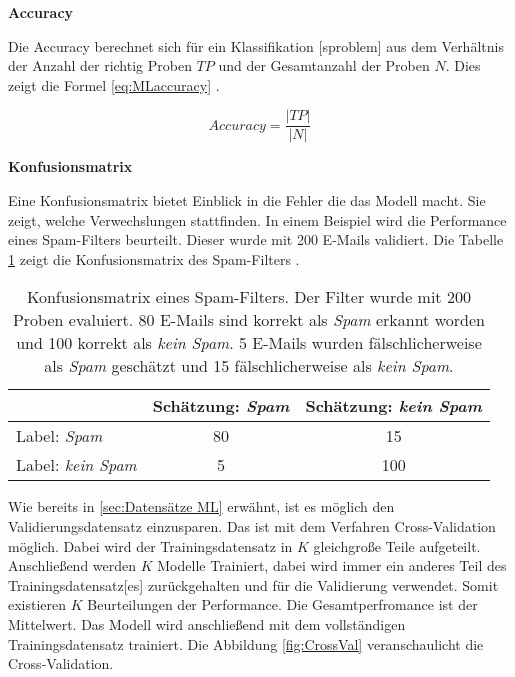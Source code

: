\textbf{\gls{Accuracy}}\par

Die \gls{Accuracy} berechnet sich für ein \gls{Klassifikation} [sproblem] aus dem Verhältnis der Anzahl der richtig  Proben \(TP\) und der Gesamtanzahl der Proben \(N\). Dies zeigt die Formel \ref{eq:MLaccuracy} \cite{Zheng.2015}.

\begin{equation}
Accuracy = \frac{|TP|}{|N|}
\label{eq:MLaccuracy}
\end{equation}

\textbf{\gls{Konfusionsmatrix}}\par
Eine \gls{Konfusionsmatrix} bietet Einblick in die Fehler die das Modell macht. Sie zeigt, welche Verwechslungen stattfinden. In einem Beispiel wird die Performance eines Spam-Filters beurteilt. Dieser wurde mit 200 E-Mails validiert. Die Tabelle \ref{tab:bspConfMat} zeigt die \gls{Konfusionsmatrix} des Spam-Filters \cite{Zheng.2015}.

\begin{table}[h]
    \centering
    \begin{tabular}{|l|c|c|}
        \hline
                                    & Schätzung: \textit{Spam} & Schätzung: \textit{kein Spam}\\
        \hline
        Label: \textit{Spam}        & 80 & 15 \\
        \hline
        Label: \textit{kein Spam}   &  5 & 100\\
        \hline
    \end{tabular}
    \caption{\gls{Konfusionsmatrix} eines Spam-Filters. Der Filter wurde mit 200 Proben evaluiert. 80 E-Mails sind korrekt als \textit{Spam} erkannt worden und 100 korrekt als \textit{kein Spam}. 5 E-Mails wurden fälschlicherweise als \textit{Spam} geschätzt und 15 fälschlicherweise als \textit{kein Spam}.}
    \label{tab:bspConfMat}
\end{table}

Wie bereits in \ref{sec:Datensätze ML} erwähnt, ist es möglich den Validierungsdatensatz einzusparen. Das ist mit dem Verfahren \gls{Cross-Validation} möglich. Dabei wird der \gls{Trainingsdatensatz} in \(K\) gleichgroße Teile aufgeteilt. Anschließend werden \(K\) Modelle Trainiert, dabei wird immer ein anderes Teil des \gls{Trainingsdatensatz}[es] zurückgehalten und für die Validierung verwendet. Somit existieren \(K\) Beurteilungen der Performance. Die Gesamtperfromance ist der Mittelwert. Das Modell wird anschließend mit dem vollständigen \gls{Trainingsdatensatz} trainiert. Die Abbildung \ref{fig:CrossVal} veranschaulicht die \gls{Cross-Validation}.

